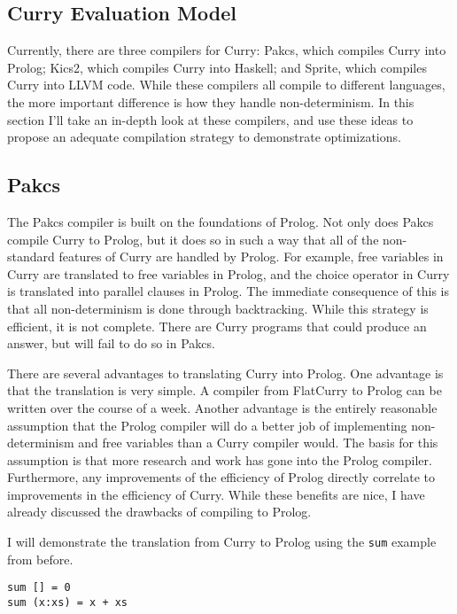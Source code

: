 
\subsection{Curry Evaluation Model}

Currently, there are three compilers for Curry:
Pakcs, which compiles Curry into Prolog;
Kics2, which compiles Curry into Haskell;
and Sprite, which compiles Curry into LLVM code.
While these compilers all compile to different languages,
the more important difference is how they handle non-determinism.
In this section I'll take an in-depth look at these compilers,
and use these ideas to propose an adequate compilation strategy
to demonstrate optimizations.

\subsection{Pakcs}

The Pakcs compiler is built on the foundations of Prolog.
Not only does Pakcs compile Curry to Prolog,
but it does so in such a way that all of the non-standard features 
of Curry are handled by Prolog.
For example, free variables in Curry are translated to free variables in Prolog,
and the choice operator in Curry is translated into parallel clauses in Prolog.
The immediate consequence of this is that all non-determinism is done through backtracking.
While this strategy is efficient, it is not complete.
There are Curry programs that could produce an answer, but will fail to do so in Pakcs.

There are several advantages to translating Curry into Prolog.
One advantage is that the translation is very simple.
A compiler from FlatCurry to Prolog can be written over the course of a week.
Another advantage is the entirely reasonable assumption that the Prolog compiler
will do a better job of implementing non-determinism and free variables than a Curry compiler would.
The basis for this assumption is that more research and work has gone into the Prolog compiler.
Furthermore, any improvements of the efficiency of Prolog directly correlate to improvements
in the efficiency of Curry.
While these benefits are nice, I have already discussed the drawbacks of compiling to Prolog.

I will demonstrate the translation from Curry to Prolog using the \texttt{sum} example from before.

\begin{verbatim}
sum [] = 0
sum (x:xs) = x + xs
\end{verbatim}

